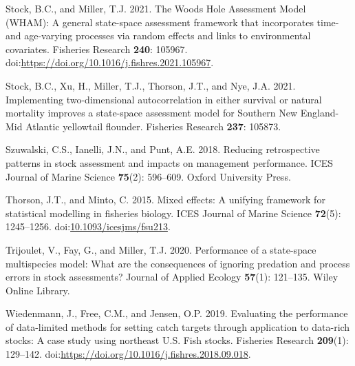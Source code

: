 \documentclass[
  12pt,
]{article}
\newlength{\cslhangindent}
\newlength{\cslentryspacingunit} %
\newenvironment{CSLReferences}[2] %
 {%
  \setlength{\parindent}{0pt}
  \ifodd #1
  \let\oldpar\par
  \def\par{\hangindent=\cslhangindent\oldpar}
  \fi
  \setlength{\parskip}{#2\cslentryspacingunit}
 }%
 {}
\begin{document}
\begin{CSLReferences}{1}{0}
\leavevmode{}%
Stock, B.C., and Miller, T.J. 2021. The {W}oods {H}ole {A}ssessment
{M}odel ({WHAM}): {A} general state-space assessment framework that
incorporates time- and age-varying processes via random effects and
links to environmental covariates. Fisheries Research \textbf{240}:
105967. doi:\url{https://doi.org/10.1016/j.fishres.2021.105967}.

\leavevmode{}%
Stock, B.C., Xu, H., Miller, T.J., Thorson, J.T., and Nye, J.A. 2021.
{Implementing two-dimensional autocorrelation in either survival or
natural mortality improves a state-space assessment model for Southern
New England-Mid Atlantic yellowtail flounder}. Fisheries Research
\textbf{237}: 105873.

\leavevmode{}%
Szuwalski, C.S., Ianelli, J.N., and Punt, A.E. 2018. Reducing
retrospective patterns in stock assessment and impacts on management
performance. ICES Journal of Marine Science \textbf{75}(2): 596--609.
Oxford University Press.

\leavevmode{}%
Thorson, J.T., and Minto, C. 2015. Mixed effects: A unifying framework
for statistical modelling in fisheries biology. ICES Journal of Marine
Science \textbf{72}(5): 1245--1256.
doi:\href{https://doi.org/10.1093/icesjms/fsu213}{10.1093/icesjms/fsu213}.

\leavevmode{}%
Trijoulet, V., Fay, G., and Miller, T.J. 2020. Performance of a
state-space multispecies model: What are the consequences of ignoring
predation and process errors in stock assessments? Journal of Applied
Ecology \textbf{57}(1): 121--135. Wiley Online Library.

\leavevmode{}%
Wiedenmann, J., Free, C.M., and Jensen, O.P. 2019. Evaluating the
performance of data-limited methods for setting catch targets through
application to data-rich stocks: A case study using northeast {U.S.}
Fish stocks. Fisheries Research \textbf{209}(1): 129--142.
doi:\url{https://doi.org/10.1016/j.fishres.2018.09.018}.

\end{CSLReferences}

\pagebreak

\clearpage
\end{document}

